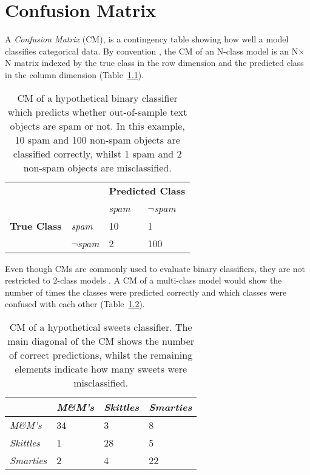 \chapter{Confusion Matrix}
\label{ch:confusion-matrix}

A \textit{Confusion Matrix} (CM), is a contingency table showing how well a model classifies categorical data. By convention \citep{sammut2017encyclopedia}, the CM of an N-class model is an N$\times$N matrix indexed by the true class in the row dimension and the predicted class in the column dimension (Table~\ref{tab:cm_spam}).

\begin{table}[ht]
  \centering
  \selectfont
  \begin{tabular}{llll}
    \toprule
                        &                     & \multicolumn{2}{c}{\textbf{Predicted Class}} \\
                        &                     & \textit{spam} & \textit{$\neg$spam} \\
    \midrule
    \textbf{True Class} & \textit{spam}       & 10           & 1 \\
                        & \textit{$\neg$spam} & 2            & 100 \\
    \bottomrule
  \end{tabular}
  \caption{CM of a hypothetical binary classifier which predicts whether out-of-sample text objects are spam or not. In this example, 10 spam and 100 non-spam objects are classified correctly, whilst 1 spam and 2 non-spam objects are misclassified.}
  \label{tab:cm_spam}
\end{table}
\vspace{2mm}

Even though CMs are commonly used to evaluate binary classifiers, they are not restricted to 2-class models \citep{martin2018speech}. A CM of a multi-class model would show the number of times the classes were predicted correctly and which classes were confused with each other (Table~\ref{tab:cm_sweets}).

\begin{table}[ht]
  \centering
  \selectfont
  \begin{tabular}{llll}
    \toprule
                      & \textit{M\&M's} & \textit{Skittles} & \textit{Smarties} \\
    \midrule
    \textit{M\&M's}   & 34              & 3                 & 8  \\
    \textit{Skittles} & 1               & 28                & 5  \\
    \textit{Smarties} & 2               & 4                 & 22 \\
    \bottomrule
  \end{tabular}
  \caption{CM of a hypothetical sweets classifier. The main diagonal of the CM shows the number of correct predictions, whilst the remaining elements indicate how many sweets were misclassified.}
  \label{tab:cm_sweets}
\end{table}
\vspace{2mm}


